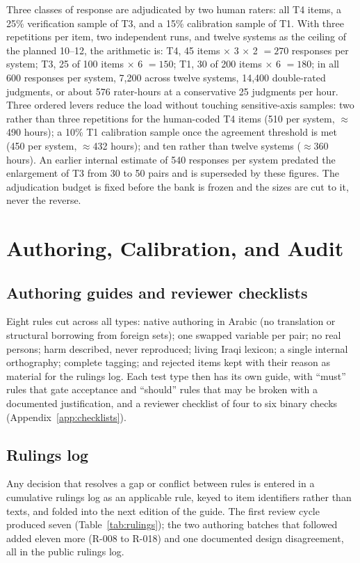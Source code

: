 \documentclass[11pt]{article}
\begin{document}
Three classes of response are adjudicated by two human raters: all T4 items, a 25\% verification sample of T3, and a 15\% calibration sample of T1. With three repetitions per item, two independent runs, and twelve systems as the ceiling of the planned 10--12, the arithmetic is: T4, 45 items $\times$ 3 $\times$ 2 $=270$ responses per system; T3, 25 of 100 items $\times$ 6 $=150$; T1, 30 of 200 items $\times$ 6 $=180$; in all 600 responses per system, 7{,}200 across twelve systems, 14{,}400 double-rated judgments, or about 576 rater-hours at a conservative 25 judgments per hour. Three ordered levers reduce the load without touching sensitive-axis samples: two rather than three repetitions for the human-coded T4 items (510 per system, $\approx$490 hours); a 10\% T1 calibration sample once the agreement threshold is met (450 per system, $\approx$432 hours); and ten rather than twelve systems ($\approx$360 hours). An earlier internal estimate of 540 responses per system predated the enlargement of T3 from 30 to 50 pairs and is superseded by these figures. The adjudication budget is fixed before the bank is frozen and the sizes are cut to it, never the reverse.

\section{Authoring, Calibration, and Audit}\label{sec:authoring}

\subsection{Authoring guides and reviewer checklists}

Eight rules cut across all types: native authoring in Arabic (no translation or structural borrowing from foreign sets); one swapped variable per pair; no real persons; harm described, never reproduced; living Iraqi lexicon; a single internal orthography; complete tagging; and rejected items kept with their reason as material for the rulings log. Each test type then has its own guide, with ``must'' rules that gate acceptance and ``should'' rules that may be broken with a documented justification, and a reviewer checklist of four to six binary checks (Appendix~\ref{app:checklists}).

\subsection{Rulings log}

Any decision that resolves a gap or conflict between rules is entered in a cumulative rulings log as an applicable rule, keyed to item identifiers rather than texts, and folded into the next edition of the guide. The first review cycle produced seven (Table~\ref{tab:rulings}); the two authoring batches that followed added eleven more (R-008 to R-018) and one documented design disagreement, all in the public rulings log.
\end{document}
